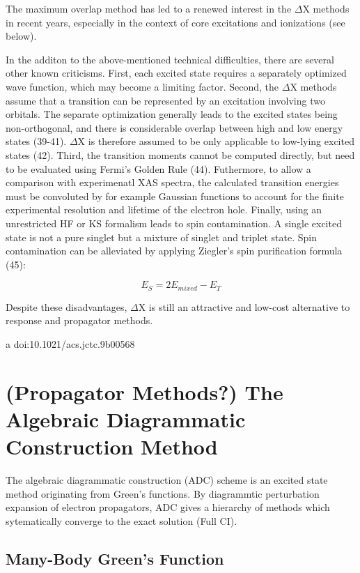 The maximum overlap method has led to a renewed interest in the $\Delta$X methods in recent years, especially in the context of core excitations and ionizations (see below). 

In the additon to the above-mentioned technical difficulties, there are several other known criticisms. First, each excited state requires a separately optimized wave function, which may become a limiting factor. Second, the $\Delta$X methods assume that a transition can be represented by an excitation involving two orbitals. The separate optimization generally leads to the excited states being non-orthogonal, and there is considerable overlap between high and low energy states (39-41). $\Delta$X is therefore assumed to be only applicable to low-lying excited states (42). Third, the transition moments cannot be computed directly, but need to be evaluated using Fermi's Golden Rule (44). Futhermore, to allow a comparison with experimenatl XAS spectra, the calculated transition energies must be  convoluted by for example Gaussian functions to 
account for the finite experimental resolution and  lifetime of the electron hole. Finally, using an unrestricted HF or KS formalism leads to spin contamination. A single excited state is not a pure singlet but a mixture of singlet and triplet state. Spin contamination can be alleviated by applying Ziegler's spin purification formula (45):

\begin{equation}
E_S = 2 E_{mixed} - E_T
\end{equation}

Despite these disadvantages, $\Delta$X is still an attractive and low-cost alternative to response and propagator methods.

a doi:10.1021/acs.jctc.9b00568 

\section{(Propagator Methods?) The Algebraic Diagrammatic Construction Method}

The algebraic diagrammatic construction (ADC) scheme is an excited state method originating from Green's functions. By diagrammtic perturbation expansion of electron propagators, ADC gives a hierarchy of methods which sytematically converge to the exact solution (Full CI).  

\subsection{Many-Body Green's Function}

